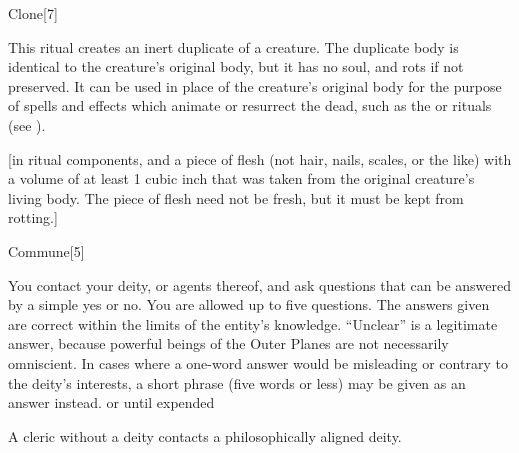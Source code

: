 \begin{spellsection}{Clone}[7]
    \begin{spellheader}
    \end{spellheader}
    \begin{spellcontent}
        \begin{spelltargetinginfo}
        \end{spelltargetinginfo}
        \begin{spelleffects}
            \spelleffect This ritual creates an inert duplicate of a creature. The duplicate body is identical to the creature's original body, but it has no soul, and rots if not preserved. It can be used in place of the creature's original body for the purpose of spells and effects which animate or resurrect the dead, such as the  or  rituals (see ).
        \end{spelleffects}
    \end{spellcontent}
    \begin{spellfooter}
        [in ritual components, and a piece of flesh (not hair, nails, scales, or the like) with a volume of at least 1 cubic inch that was taken from the original creature's living body. The piece of flesh need not be fresh, but it must be kept from rotting.]
    \end{spellfooter}
\end{spellsection}

\begin{spellsection}{Commune}[5]
    \begin{spellheader}
    \end{spellheader}
    \begin{spellcontent}
        \begin{spelltargetinginfo}
        \end{spelltargetinginfo}
        \begin{spelleffects}
            \spelleffect You contact your deity, or agents thereof, and ask questions that can be answered by a simple yes or no. You are allowed up to five questions. The answers given are correct within the limits of the entity's knowledge. ``Unclear'' is a legitimate answer, because powerful beings of the Outer Planes are not necessarily omniscient. In cases where a one-word answer would be misleading or contrary to the deity's interests, a short phrase (five words or less) may be given as an answer instead.
            \spelldur \durmed or until expended
        \end{spelleffects}
    \end{spellcontent}
    \begin{spellfooter}
        \spellnotes A cleric without a deity contacts a philosophically aligned deity.
    \end{spellfooter}
\end{spellsection}

